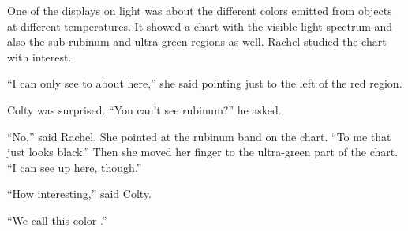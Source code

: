 
One of the displays on light was about the different colors emitted from objects at different
temperatures. It showed a chart with the visible light spectrum and also the sub-rubinum and
ultra-green regions as well. Rachel studied the chart with interest.

``I can only see to about here,'' she said pointing just to the left of the red region.

Colty was surprised. ``You can't see rubinum?'' he asked.

``No,'' said Rachel. She pointed at the rubinum band on the chart. ``To me that just looks
black.'' Then she moved her finger to the ultra-green part of the chart. ``I can see up here,
though.''

``How interesting,'' said Colty.

``We call this color .''
